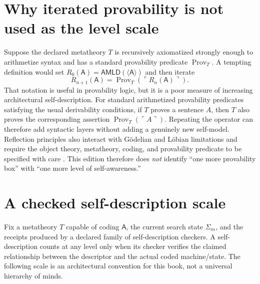 \documentclass[11pt,openany]{book}
\theoremstyle{definition}
\theoremstyle{remark}
\newcommand{\State}{\Sigma}
\newcommand{\Prov}{\operatorname{Prov}}
\newcommand{\AMLD}{\ensuremath{\mathsf{AMLD}}\xspace}
\begin{document}
\section{Why iterated provability is not used as the level scale}
Suppose the declared metatheory $T$ is recursively axiomatized strongly enough to arithmetize syntax and has a standard provability predicate $\Prov_T$. A tempting definition would set $R_0(\mathsf A)=\AMLD(\langle\mathsf A\rangle)$ and then iterate
\[
R_{n+1}(\mathsf A)=\Prov_T(\ulcorner R_n(\mathsf A)\urcorner).
\]
That notation is useful in provability logic, but it is a poor measure of increasing architectural self-description. For standard arithmetized provability predicates satisfying the usual derivability conditions, if $T$ proves a sentence $A$, then $T$ also proves the corresponding assertion $\Prov_T(\ulcorner A\urcorner)$. Repeating the operator can therefore add syntactic layers without adding a genuinely new self-model. Reflection principles also interact with G\"odelian and L\"obian limitations and require the object theory, metatheory, coding, and provability predicate to be specified with care \cite{SEPProvability}. This edition therefore does \emph{not} identify ``one more provability box'' with ``one more level of self-awareness.''

\section{A checked self-description scale}
Fix a metatheory $T$ capable of coding $\mathsf A$, the current search state $\State_m$, and the receipts produced by a declared family of self-description checkers. A self-description counts at any level only when its checker verifies the claimed relationship between the descriptor and the actual coded machine/state. The following scale is an architectural convention for this book, not a universal hierarchy of minds.
\end{document}
